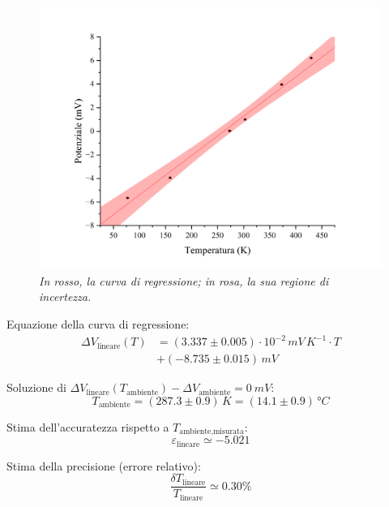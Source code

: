 \documentclass{article}
\begin{document}
\pagebreak
\begin{figure}[H]
  \centering
  \includegraphics[trim={2cm 0.6cm 3cm 1cm},clip,width=\textwidth]{img/regressione1.png}
  \caption*{\emph{
    In rosso, la curva di regressione; in rosa, la sua regione di incertezza.
  }}
\end{figure}

Equazione della curva di regressione:
\[\begin{aligned}\Delta V_\text{lineare}(T)
  &= (3.337\pm0.005)\cdot10^{-2}\,\unit{mV\,K^{-1}}\cdot T \\
  &+ (-8.735\pm0.015)\,\unit{mV}
\end{aligned}\]

Soluzione di $
  \Delta V_\text{lineare}(T_\text{ambiente}) -
  \Delta V_\text{ambiente} = \qty{0}{mV}$:
\[T_\text{ambiente}
  = (287.3\pm0.9)\,\unit{K}
  = (14.1\pm0.9)\,\unit{\degree C}
\]

Stima dell'accuratezza rispetto a $T_\text{ambiente,misurata}$:
\[ \varepsilon_\text{lineare} \simeq -5.021 \]

Stima della precisione (errore relativo):
\[ \frac{\delta T_\text{lineare}}{T_\text{lineare}} \simeq 0.30\% \]
\end{document}
